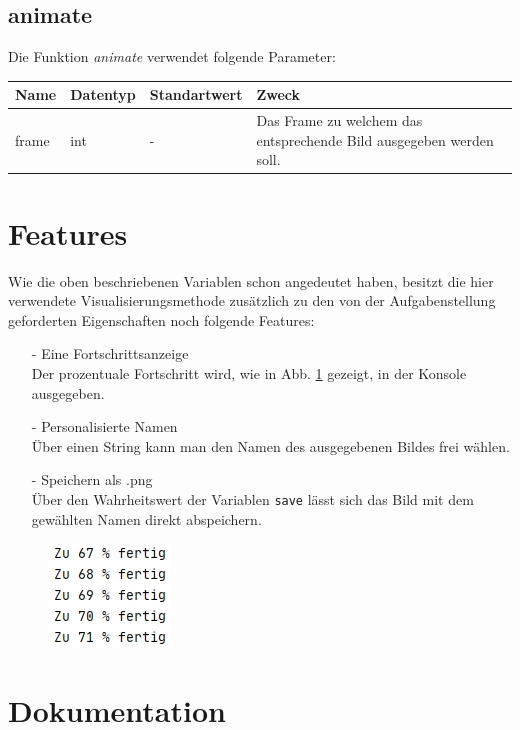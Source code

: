 \documentclass[12pt]{scrartcl}
\begin{document}
\subsection{animate}
Die Funktion \textit{animate} verwendet folgende Parameter:

\begin{center}
\begin{tabular}{|p{2cm}|p{2cm}|p{2.8cm}|p{7cm}|}
\hline
\textbf{Name} & \textbf{Datentyp} & \textbf{Standartwert} & \textbf{Zweck} \\
\hline \hline
frame & int & - & Das Frame zu welchem das entsprechende Bild ausgegeben werden soll.\\
\hline
\end{tabular}
\end{center}


\section{Features}
Wie die oben beschriebenen Variablen schon angedeutet haben, besitzt die hier verwendete Visualisierungsmethode zusätzlich zu den von der Aufgabenstellung geforderten Eigenschaften noch folgende Features:
\begin{itemize}
\item[-] Eine Fortschrittsanzeige\\
Der prozentuale Fortschritt wird, wie in Abb. \ref{Fortschritt} gezeigt, in der Konsole ausgegeben.
\item[-] Personalisierte Namen\\
Über einen String kann man den Namen des ausgegebenen Bildes frei wählen.
\item[-] Speichern als .png\\
Über den Wahrheitswert der Variablen \texttt{save} lässt sich das Bild mit dem gewählten Namen direkt abspeichern.
\end{itemize}

\begin{figure}[H]
\centering
\includegraphics[scale=1]{Fortschritt.jpg}
\caption{}
\label{Fortschritt}
\end{figure}

\section{Dokumentation}
\end{document}
